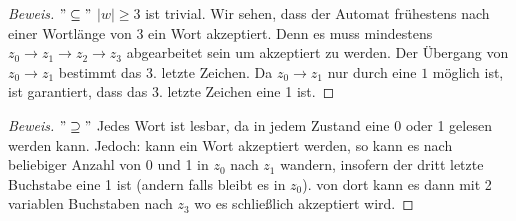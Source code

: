 \begin{proof}[Beweis] $"\subseteq"$
	$\mid w\mid\ge3$ ist trivial. Wir sehen, dass der Automat frühestens nach einer Wortlänge von 3 ein Wort akzeptiert. Denn es muss mindestens $z_0\rightarrow z_1\rightarrow z_2\rightarrow z_3$ abgearbeitet sein um akzeptiert zu werden. Der Übergang von $z_0\rightarrow z_1$ bestimmt das 3. letzte Zeichen. Da $z_0\rightarrow z_1$ nur durch eine $1$ möglich ist, ist garantiert, dass das 3. letzte Zeichen eine 1 ist.
\end{proof}
\begin{proof}[Beweis] $"\supseteq"$
	Jedes Wort ist lesbar, da in jedem Zustand eine 0 oder 1 gelesen werden kann. Jedoch: kann ein Wort akzeptiert werden, so kann es nach beliebiger Anzahl von 0 und 1 in $z_0$ nach $z_1$ wandern, insofern der dritt letzte Buchstabe eine 1 ist (andern falls bleibt es in $z_0$). von dort kann es dann mit 2 variablen Buchstaben nach $z_3$ wo es schließlich akzeptiert wird. 
\end{proof}